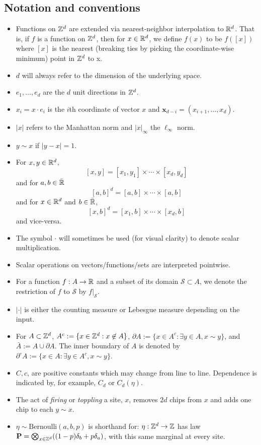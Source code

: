 \documentclass[12pt]{amsart}
\begin{document}
\subsection*{Notation and conventions} 
\begin{itemize}
	\item Functions on $\mathbb{Z}^d$ are extended via nearest-neighbor interpolation to $\mathbb{R}^d$.  
	That is, if $f$ is a function on $\mathbb{Z}^d$, then for $x \in \mathbb{R}^d$, we define $f(x)$ to be $f([x])$ where $[x]$ is the nearest (breaking ties by picking the coordinate-wise minimum) point in $\mathbb{Z}^d$ to x. 
	\item $d$ will always refer to the dimension of the underlying space.
	\item $e_1, \ldots, e_d$ are the $d$ unit directions in $\mathbb{Z}^d$.
	\item $x_i = x \cdot e_i$ is the $i$th coordinate of vector $x$ and $\mathbf{x}_{d-i} = (x_{i+1}, \ldots, x_d)$.
	\item $|x|$ refers to the Manhattan norm and $|x|_{\infty}$ the $\ell_\infty$ norm.
	\item $y \sim x$ if $|y-x| = 1$. 
	\item For $x,y \in \mathbb{R}^d$, 
	\[
	[x,y] = [x_1, y_1]  \times \cdots \times [x_d, y_d]
	\]
	and for $a,b \in \bar{\mathbb{R}}$
	\[
	[a,b]^d = [a,b] \times \cdots \times [a,b]
	\]
	and for $x \in \mathbb{R}^d$ and $b \in \bar{\mathbb{R}}$, 
	\[
	[x,b]^d = [x_1,b] \times \cdots \times [x_d, b]
	\]
	and vice-versa. 
	\item The symbol $\cdot$ will sometimes be used (for visual clarity) to denote scalar multiplication. 
	\item Scalar operations on vectors/functions/sets are interpreted pointwise.
	\item  For a function  $f:A \to \mathbb{R}$ and a subset of its domain $\mathcal{S} \subset A$, we denote the restriction of $f$ to $\mathcal{S}$ by  $f|_{\mathcal{S}}$. 
	\item $|\cdot|$ is either the counting measure or Lebesgue measure depending on the input.
	\item For $A \subset \mathbb{Z}^d$, $A^c := \{ x \in \mathbb{Z}^d : x \not \in A\}$, $\partial A := \{x \in A^c : \exists y \in A, x \sim y\}$,
	and $\bar{A} := A \cup \partial A$. The inner boundary of $A$ is denoted by $\partial^{\circ} A  := \{ x \in A : 
	\exists y \in A^c, x \sim y\}$. 
	\item $C,c$, are positive constants which may change from line to line. Dependence is indicated by, for example, $C_d$ or $C_d(\eta)$.
	\item  The act of {\it firing} or {\it toppling} a site, $x$, removes $2 d$ chips from $x$ and adds one chip to each $y \sim x$.
	\item  $\eta \sim \mbox{Bernoulli}(a, b, p)$ is shorthand for: $\eta:\mathbb{Z}^d\to\mathbb{Z}$ has law $\mathbf P=\bigotimes_{x\in\mathbb{Z}^d}((1-p)\delta_b+p\delta_a)$, with this same marginal at every site.
\end{itemize}
\end{document}
